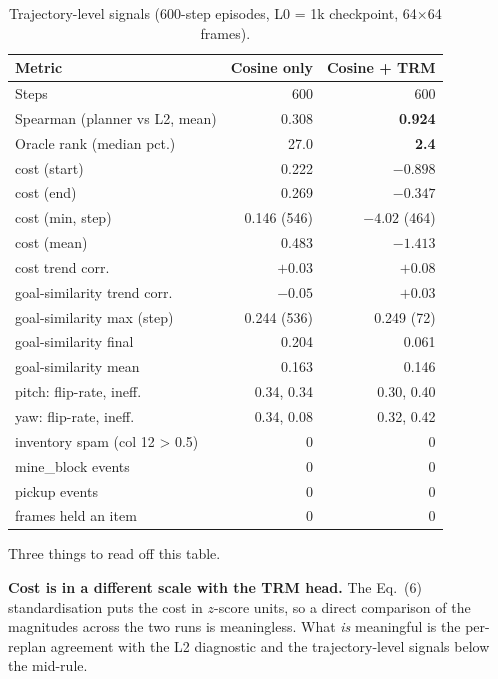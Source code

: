 \documentclass[11pt]{article}
\begin{document}
\begin{table}[t]
\centering
\caption{Trajectory-level signals (600-step episodes, L0 = 1k
checkpoint, 64$\times$64 frames).}
\label{tab:traj}
\smallskip
\begin{tabular}{lrr}
\toprule
Metric & Cosine only & Cosine + TRM \\
\midrule
Steps & 600 & 600 \\
Spearman (planner vs L2, mean) & 0.308 & \textbf{0.924} \\
Oracle rank (median pct.)      & 27.0 & \textbf{ 2.4} \\
\midrule
cost (start)                   & 0.222 & $-0.898$ \\
cost (end)                     & 0.269 & $-0.347$ \\
cost (min, step)               & 0.146 (546) & $-4.02$ (464) \\
cost (mean)                    & 0.483 & $-1.413$ \\
cost trend corr.               & $+0.03$ & $+0.08$ \\
\midrule
goal-similarity trend corr.    & $-0.05$ & $+0.03$ \\
goal-similarity max (step)     & 0.244 (536) & 0.249 (72) \\
goal-similarity final          & 0.204 & 0.061 \\
goal-similarity mean           & 0.163 & 0.146 \\
\midrule
pitch: flip-rate, ineff.       & 0.34, 0.34 & 0.30, 0.40 \\
yaw:   flip-rate, ineff.       & 0.34, 0.08 & 0.32, 0.42 \\
\midrule
inventory spam (col 12 > 0.5)  & 0 & 0 \\
mine\_block events             & 0 & 0 \\
pickup events                  & 0 & 0 \\
frames held an item            & 0 & 0 \\
\bottomrule
\end{tabular}
\end{table}

Three things to read off this table.

\textbf{Cost is in a different scale with the TRM head.}
The Eq.~(6) standardisation puts the cost in $z$-score units, so a
direct comparison of the magnitudes across the two runs is
meaningless. What \emph{is} meaningful is the per-replan agreement
with the L2 diagnostic and the trajectory-level signals below the
mid-rule.
\end{document}
